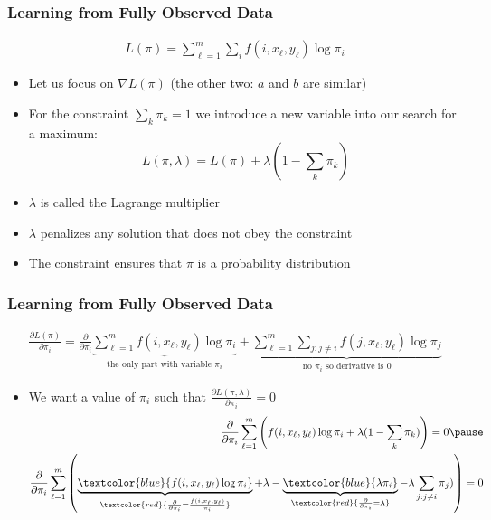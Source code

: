 \begin{frame}
\frametitle{Learning from Fully Observed Data}
{\small\begin{eqnarray*} L(\pi) = \sum_{\ell=1}^m \sum_i f(i,x_\ell,y_\ell) \log \pi_i \end{eqnarray*}}
\begin{itemize}[<+->]
\item Let us focus on $\nabla L(\pi)$ (the other two: $a$ and $b$ are similar)
\item For the constraint $\sum_k \pi_k = 1$ we introduce a new variable into our search for a maximum:
\[ L(\pi, \lambda) = L(\pi) + \lambda ( 1 - \sum_k \pi_k ) \]
\item $\lambda$ is called the Lagrange multiplier
\item $\lambda$ penalizes any solution that does not obey the constraint
\item The constraint ensures that $\pi$ is a probability distribution
\end{itemize}
\end{frame}

\begin{frame}
\frametitle{Learning from Fully Observed Data}
{\small\begin{eqnarray*} \frac{\partial L(\pi)}{\partial \pi_i} = \frac{\partial }{\partial \pi_i} \underbrace{\sum_{\ell=1}^m f(i,x_\ell,y_\ell) \log \pi_i}_{\textrm{the only part with variable $\pi_i$}} + \underbrace{\sum_{\ell=1}^m \sum_{j : j \neq i}  f(j,x_\ell,y_\ell) \log \pi_j}_{\textrm{no $\pi_i$ so derivative is $0$}} \end{eqnarray*}}
\begin{itemize}[<+->]
\item We want a value of $\pi_i$ such that $\frac{\partial L(\pi, \lambda)}{\partial \pi_i} = 0$ \pause
\begin{eqnarray*}
\frac{\partial }{\partial \pi_i} \sum_{\ell=1}^m \left( f(i,x_\ell,y_\ell) \log \pi_i + \lambda ( 1 - \sum_k \pi_k ) \right) = 0 \pause \\
\frac{\partial }{\partial \pi_i} \sum_{\ell=1}^m \left( \underbrace{\textcolor{blue}{f(i,x_\ell,y_\ell) \log \pi_i}}_{\textcolor{red}{\frac{\partial }{\partial \pi_i}=\frac{f(i,x_\ell,y_\ell)}{\pi_i}}} + \lambda - \underbrace{\textcolor{blue}{\lambda \pi_i}}_{\textcolor{red}{\frac{\partial }{\partial \pi_i}=\lambda}} - \lambda \sum_{j : j \neq i} \pi_j ) \right) = 0 
\end{eqnarray*}
\end{itemize}
\end{frame}

